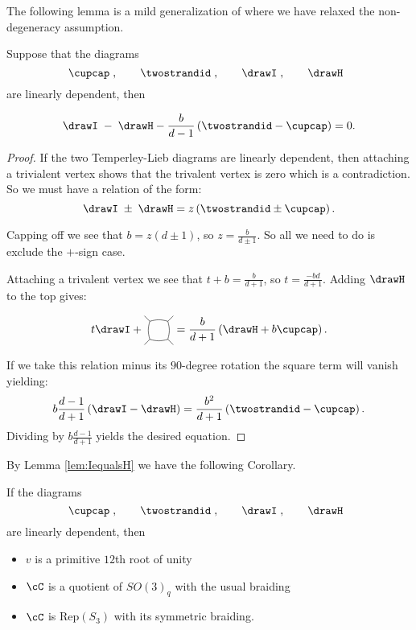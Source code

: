 \documentclass[12pt]{amsart}
\begin{document}
The following lemma is a mild generalization of \cite{???} where we have relaxed the non-degeneracy assumption.


\begin{lemma}
Suppose that the diagrams   
  \[
  \cupcap\;,\qquad\twostrandid\;,
    \qquad\drawI\;,\qquad\drawH\;\;
   \]
are linearly dependent, then
 
$$\drawI\; - \; \drawH - \frac{b}{d-1} \left(\twostrandid - \cupcap \right) = 0.$$
\end{lemma}
\begin{proof}
If the two Temperley-Lieb diagrams are linearly dependent, then attaching a trivialent vertex shows that the trivalent vertex is zero which is a contradiction.  So we must have a relation of the form:
$$\drawI\;\pm \; \drawH = z \left(\twostrandid \pm \cupcap \right).$$

Capping off we see that $b= z (d \pm 1)$, so $z = \frac{b}{d \pm 1}$.  So all we need to do is exclude the $+$-sign case.

Attaching a trivalent vertex we see that $t + b = \frac{b}{d + 1}$, so $t =  \frac{-b d}{d + 1}$.  Adding $\drawH$ to the top gives:

$$t \drawI + \ngon[45]{4} = \frac{b}{d+1} \left( \drawH + b \cupcap\right).$$

If we take this relation minus its $90$-degree rotation the square term will vanish yielding:
$$ b \frac{d-1}{d+1} \left( \drawI -\drawH \right) = \frac{b^2}{d+1} \left(\twostrandid - \cupcap\right).$$
Dividing by $b \frac{d-1}{d+1}$ yields the desired equation.
\end{proof}

By Lemma \ref{lem:IequalsH} we have the following Corollary.

\begin{corollary}
If the diagrams   
  \[
  \cupcap\;,\qquad\twostrandid\;,
    \qquad\drawI\;,\qquad\drawH\;\;
   \]
are linearly dependent, then
\begin{itemize}
\item $v$ is a primitive $12$th root of unity
\item $\cC$ is a quotient of $SO(3)_q$ with the usual braiding
\item $\cC$ is $\mathrm{Rep}(S_3)$ with its symmetric braiding.
\end{itemize}
\end{corollary}
\end{document}
